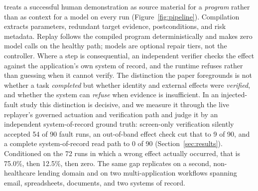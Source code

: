 \system{} treats a successful human demonstration as source material for a
\emph{program} rather than as context for a model on every run
(Figure~\ref{fig:pipeline}). Compilation extracts parameters, redundant target
evidence, postconditions, and risk metadata. Replay follows the compiled program
deterministically and makes zero model calls on the healthy path; models are
optional repair tiers, not the controller. Where a step is consequential, an
independent verifier checks the effect against the application's own
system of record, and the runtime refuses rather than guessing when it cannot
verify. The distinction the paper foregrounds is not whether a task
\emph{completed} but whether identity and external effects were \emph{verified},
and whether the system can \emph{refuse} when evidence is insufficient. In an
injected-fault study this distinction is decisive, and we measure it through the
live replayer's governed actuation and verification path and judge it by an
independent system-of-record ground
truth: screen-only verification silently accepted 54 of 90 fault runs, an
out-of-band effect check cut that to 9 of 90, and a complete system-of-record
read path to 0 of 90 (Section~\ref{sec:results}). Conditioned on the 72 runs in
which a wrong effect actually occurred, that is 75.0\%, then 12.5\%, then zero. The same gap replicates on a
second, non-healthcare lending domain and on two multi-application workflows
spanning email, spreadsheets, documents, and two systems of record.


